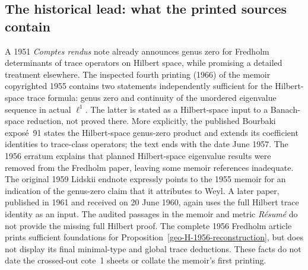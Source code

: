 \subsection{The historical lead: what the printed sources contain}
\begin{proposition}
\label{geo-H-history}
A 1951 \emph{Comptes rendus} note already announces genus zero for
Fredholm determinants of trace operators on Hilbert space, while
promising a detailed treatment elsewhere.
The inspected fourth printing (1966) of the memoir copyrighted 1955
contains two statements independently sufficient for the Hilbert-space
trace formula: genus zero and continuity of the unordered eigenvalue
sequence in actual $\ell^1$. The latter is stated as a Hilbert-space input
to a Banach-space reduction, not proved there. More explicitly,
the published Bourbaki expos\'e~91 states the Hilbert-space genus-zero
product and extends its coefficient identities to trace-class operators;
the text ends with the date June 1957. The 1956
erratum explains that planned Hilbert-space eigenvalue results were removed
from the Fredholm paper, leaving some memoir references inadequate.
The original 1959 Lidskii endnote expressly points to the 1955 memoir
for an indication of the genus-zero claim that it attributes to Weyl.
A later paper, published in 1961 and received on 20 June 1960,
again uses the full Hilbert trace identity as an input.
The audited passages in the memoir and metric \emph{R\'esum\'e} do not
provide the missing full Hilbert proof. The complete 1956 Fredholm article
prints sufficient foundations for Proposition~\ref{geo-H-1956-reconstruction},
but does not display its final minimal-type and global trace deductions.
These facts do not date the crossed-out cote~1 sheets or collate the
memoir's first printing.
\end{proposition}
